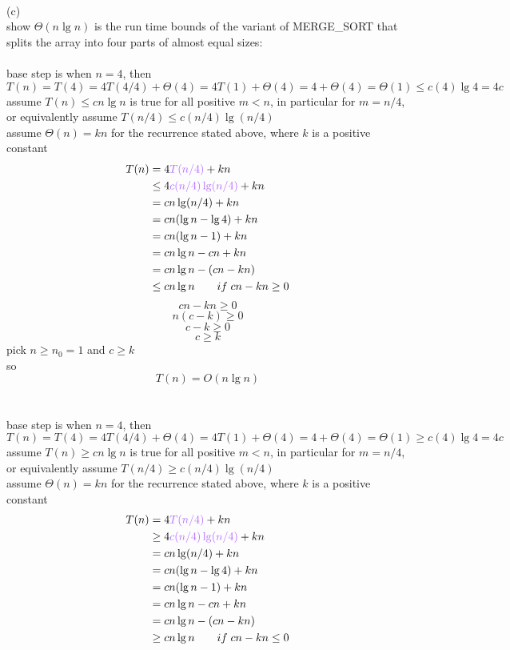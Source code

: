 \documentclass[12pt,border=4pt,multi]{article}%
\begin{document}
\\
(c)\\
show $\Theta(n\lg n)$ is the run time bounds of the variant of MERGE\_SORT that splits the array into four parts of almost equal sizes:\\
\\
base step is when $n = 4$, then $T(n) = T(4) = 4T(4 / 4) + \Theta(4) = 4T(1) + \Theta(4) = 4 + \Theta(4) = \Theta(1) \leq c(4)\lg 4 = 4c$\\
assume $T(n) \leq cn\lg n$ is true for all positive $m < n$, in particular for $m = n / 4$, or equivalently assume $T(n / 4) \leq c(n / 4)\lg(n / 4)$\\
assume $\Theta(n) = kn$ for the recurrence stated above, where $k$ is a positive constant\\
\begin{align*}
    T(n) &= 4\textcolor{orchid}{T(n / 4)} + kn\\
    &\leq 4\textcolor{orchid}{c(n / 4)\lg(n / 4)} + kn\\
    &= cn\lg(n / 4) + kn\\
    &= cn(\lg n - \lg 4) + kn\\
    &= cn(\lg n - 1) + kn\\
    &= cn\lg n - cn + kn\\
    &= cn\lg n - (cn - kn)\\
    &\leq cn\lg n \qquad if\;cn - kn \geq 0\\
\end{align*}
\[cn - kn \geq 0\]
\[n(c - k) \geq 0\]
\[c - k \geq 0\]
\[c \geq k\]
pick $n \geq n_0 = 1$ and $c \geq k$\\ 
so
\[T(n) = O(n \lg n)\]
\\
\\
base step is when $n = 4$, then $T(n) = T(4) = 4T(4 / 4) + \Theta(4) = 4T(1) + \Theta(4) = 4 + \Theta(4) = \Theta(1) \geq c(4)\lg 4 = 4c$\\
assume $T(n) \geq cn\lg n$ is true for all positive $m < n$, in particular for $m = n / 4$, or equivalently assume $T(n / 4) \geq c(n / 4)\lg(n / 4)$\\
assume $\Theta(n) = kn$ for the recurrence stated above, where $k$ is a positive constant\\
\begin{align*}
    T(n) &= 4\textcolor{orchid}{T(n / 4)} + kn\\
    &\geq 4\textcolor{orchid}{c(n / 4)\lg(n / 4)} + kn\\
    &= cn\lg(n / 4) + kn\\
    &= cn(\lg n - \lg 4) + kn\\
    &= cn(\lg n - 1) + kn\\
    &= cn\lg n - cn + kn\\
    &= cn\lg n - (cn - kn)\\
    &\geq cn\lg n \qquad if\;cn - kn \leq 0\\
\end{align*}
\end{document}
